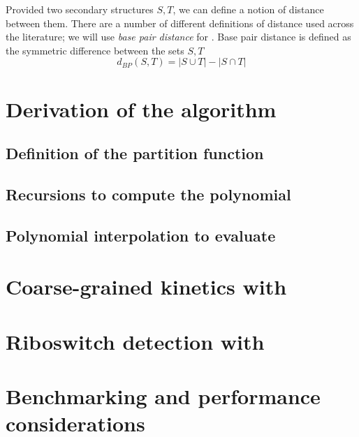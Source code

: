 Provided two secondary structures $S,T$, we can define a notion of
distance between them. There are a number of different definitions of distance
used across the literature; we will use {\em base pair distance} for \fftbor.
Base pair distance is defined as the symmetric difference between the sets
$S,T$
\begin{equation}
\label{eq:fftbor:dBP}
d_{BP}(S,T) = |S \cup T| - |S \cap T|
\end{equation}

\section{Derivation of the \fftbor algorithm}
\label{sec:fftbor:math}

\subsection{Definition of the partition function
\texorpdfstring{}{}}
\label{subsec:fftbor:recursions}

\subsection{Recursions to compute the polynomial
\texorpdfstring{}{}}
\label{subsec:fftbor:polynomial}

\subsection{Polynomial interpolation to evaluate
\texorpdfstring{}{}}
\label{subsec:fftbor:fft}

\section{Coarse-grained kinetics with \fftbor}
\label{sec:fftbor:kinetics}

\section{Riboswitch detection with \fftbor}
\label{sec:fftbor:rb}

\section{Benchmarking and performance considerations}
\label{sec:fftbor:benchmarking}
